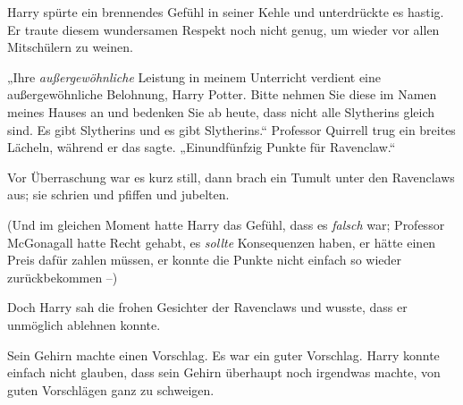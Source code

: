 Harry spürte ein brennendes Gefühl in seiner Kehle und unterdrückte es hastig. Er traute diesem wundersamen Respekt noch nicht genug, um wieder vor allen Mitschülern zu weinen.

„Ihre \emph{außergewöhnliche} Leistung in meinem Unterricht verdient eine außergewöhnliche Belohnung, Harry Potter. Bitte nehmen Sie diese im Namen meines Hauses an und bedenken Sie ab heute, dass nicht alle Slytherins gleich sind. Es gibt Slytherins und es gibt Slytherins.“ Professor Quirrell trug ein breites Lächeln, während er das sagte. „Einundfünfzig Punkte für Ravenclaw.“

Vor Überraschung war es kurz still, dann brach ein Tumult unter den Ravenclaws aus; sie schrien und pfiffen und jubelten.

(Und im gleichen Moment hatte Harry das Gefühl, dass es \emph{falsch} war; Professor McGonagall hatte Recht gehabt, es \emph{sollte} Konsequenzen haben, er hätte einen Preis dafür zahlen müssen, er konnte die Punkte nicht einfach so wieder zurückbekommen –)

Doch Harry sah die frohen Gesichter der Ravenclaws und wusste, dass er unmöglich ablehnen konnte.

Sein Gehirn machte einen Vorschlag. Es war ein guter Vorschlag. Harry konnte einfach nicht glauben, dass sein Gehirn überhaupt noch irgendwas machte, von guten Vorschlägen ganz zu schweigen.

